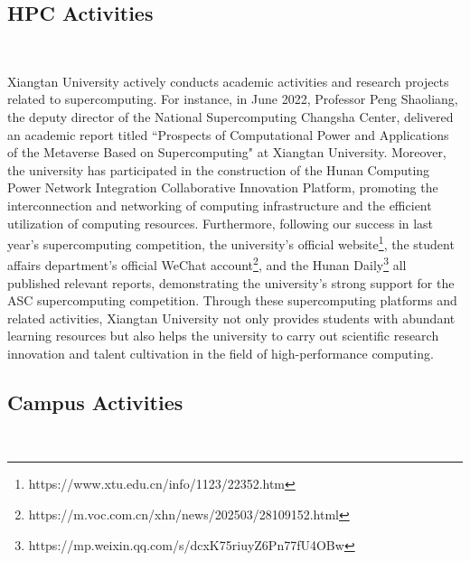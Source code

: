 \subsection{HPC Activities}
\ 


Xiangtan University actively conducts academic activities and research projects related to supercomputing. 
For instance, in June 2022, Professor Peng Shaoliang, the deputy director of the National Supercomputing Changsha Center, delivered an academic report titled ``Prospects of Computational Power and Applications of the Metaverse Based on Supercomputing" at Xiangtan University. 
Moreover, the university has participated in the construction of the Hunan Computing Power Network Integration Collaborative Innovation Platform, promoting the interconnection and networking of computing infrastructure and the efficient utilization of computing resources.
Furthermore, following our success in last year's supercomputing competition, the university's official website\footnote{https://www.xtu.edu.cn/info/1123/22352.htm}, the student affairs department's official WeChat account\footnote{https://m.voc.com.cn/xhn/news/202503/28109152.html}, and the Hunan Daily\footnote{https://mp.weixin.qq.com/s/dcxK75riuyZ6Pn77fU4OBw} all published relevant reports, demonstrating the university's strong support for the ASC supercomputing competition.
Through these supercomputing platforms and related activities, Xiangtan University not only provides students with abundant learning resources but also helps the university to carry out scientific research innovation and talent cultivation in the field of high-performance computing.

\subsection{Campus Activities}
\ 

